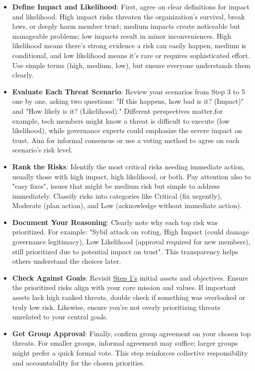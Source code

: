 \begin{itemize}

    \item \textbf{Define Impact and Likelihood}: First, agree on clear
    definitions for impact and likelihood. High impact risks threaten the
    organization's survival, break laws, or deeply harm member trust; medium impacts
    create noticeable but manageable problems; low impacts result in minor
    inconveniences. High likelihood means there's strong evidence a risk can easily
    happen, medium is conditional, and low likelihood means it's rare or requires
    sophisticated effort. Use simple terms (high, medium, low), but ensure everyone
    understands them clearly.
    
    \item \textbf{Evaluate Each Threat Scenario}: Review your scenarios from Step 3 to 5 one by one,
    asking two questions: "If this happens, how bad is it? (Impact)" and "How likely
    is it? (Likelihood)." Different perspectives matter,for example, tech members
    might know a threat is difficult to execute (low likelihood), while governance
    experts could emphasize the severe impact on trust. Aim for informal consensus
    or use a voting method to agree on each scenario's risk level.
    
    \item \textbf{Rank the Risks}: Identify the most critical risks needing immediate
    action, usually those with high impact, high likelihood, or both. Pay attention
    also to "easy fixes", issues that might be medium risk but simple to address
    immediately. Classify risks into categories like Critical (fix urgently),
    Moderate (plan action), and Low (acknowledge without immediate action).
    
    \item \textbf{Document Your Reasoning}: Clearly note why each top risk was
    prioritized. For example: "Sybil attack on voting, High Impact (could damage
    governance legitimacy), Low Likelihood (approval required for new members), still
    prioritized due to potential impact on trust". This transparency helps others
    understand the choices later.
    
    \item \textbf{Check Against Goals}: Revisit \hyperref[subsec:Step1]{Step 1's} initial assets and objectives.
    Ensure the prioritized risks align with your core mission and values. If
    important assets lack high ranked threats, double check if something was
    overlooked or truly low risk. Likewise, ensure you're not overly prioritizing
    threats unrelated to your central goals.
    
    \item \textbf{Get Group Approval}: Finally, confirm group agreement on your chosen
    top threats. For smaller groups, informal agreement may suffice; larger groups
    might prefer a quick formal vote. This step reinforces collective responsibility
    and accountability for the chosen priorities.

\end{itemize}
    
